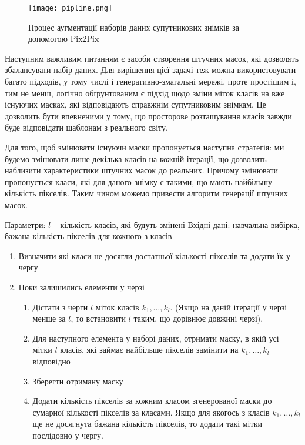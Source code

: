 \begin{figure}[!ht]
    \centering
    \texttt{[image: pipline.png]}
    \caption{Процес аугментації наборів даних супутникових знімків за допомогою Pix2Pix}
    \label{fig:pipline}
\end{figure}

Наступним важливим питанням є засоби створення штучних масок,
які дозволять збалансувати набір даних. Для вирішення цієї
задачі теж можна використовувати багато підходів, у тому числі і
генеративно-змагальні мережі, проте простішим і, тим не менш,
логічно обґрунтованим є підхід щодо зміни міток класів на вже
існуючих масках, які відповідають справжнім супутниковим знімкам.
Це дозволить бути впевненими у тому, що просторове розташування
класів завжди буде відповідати шаблонам з реального світу.

Для того, щоб змінювати існуючи маски пропонується наступна
стратегія: ми будемо змінювати лише декілька класів на кожній ітерації, що
дозволить наблизити характеристики штучних масок до реальних.
Причому змінювати пропонується класи, які для даного знімку є такими,
що мають найбільшу кількість пікселів. Таким чином можемо
привести алгоритм генерації штучних масок.

\begin{algorithm} \leavevmode \linebreak
    Параметри: $l$ -- кількість класів, які будуть змінені
    Вхідні дані: навчальна вибірка, бажана кількість пікселів для кожного з класів
    \begin{enumerate}
        \item Визначити які класи не досягли достатньої кількості пікселів та додати їх у чергу
        \item Поки залишились елементи у черзі

              \begin{enumerate}
                  \item Дістати з черги $l$ міток класів $k_1, \dots, k_l$. (Якщо на даній ітерації
                  у черзі менше за $l$, то встановити $l$ таким, що дорівнює
                  довжині черзі).
                  \item Для наступного елемента у наборі даних, отримати маску,
                        в якій усі мітки $l$ класів, які займає найбільше пікселів замінити
                        на $k_1, \dots, k_l$ відповідно
                  \item Зберегти отриману маску
                  \item Додати кількість пікселів за кожним класом згенерованої
                        маски до сумарної кількості пікселів за класами.
                        Якщо для якогось з класів $k_1, \dots, k_l$ ще не досягнута бажана
                        кількість пікселів, то додати такі мітки послідовно у чергу.
              \end{enumerate}
    \end{enumerate}
\end{algorithm}

